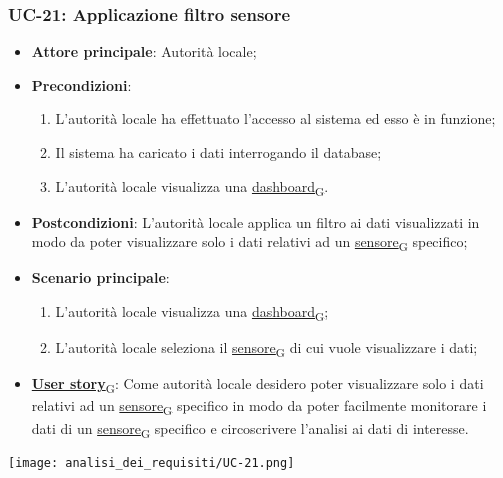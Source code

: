\subsubsection{UC-21: Applicazione filtro sensore}
\begin{itemize}
	\item \textbf{Attore principale}: Autorità locale;
	\item \textbf{Precondizioni}:
	      \begin{enumerate}
		      \item L'autorità locale ha effettuato l'accesso al sistema ed esso è in funzione;
		      \item Il sistema ha caricato i dati interrogando il database;
		      \item L'autorità locale visualizza una \href{https://7last.github.io/docs/rtb/documentazione-interna/glossario\#dashboard}{dashboard\textsubscript{G}}.
	      \end{enumerate}
	\item \textbf{Postcondizioni}: L'autorità locale applica un filtro ai dati visualizzati in modo da poter visualizzare solo i dati relativi ad un \href{https://7last.github.io/docs/rtb/documentazione-interna/glossario\#sensore}{sensore\textsubscript{G}} specifico;
	\item \textbf{Scenario principale}:
	      \begin{enumerate}
		      \item L'autorità locale visualizza una \href{https://7last.github.io/docs/rtb/documentazione-interna/glossario\#dashboard}{dashboard\textsubscript{G}};
		      \item L'autorità locale seleziona il \href{https://7last.github.io/docs/rtb/documentazione-interna/glossario\#sensore}{sensore\textsubscript{G}} di cui vuole visualizzare i dati;
	      \end{enumerate}
	\item \href{https://7last.github.io/docs/rtb/documentazione-interna/glossario\#user-story}{\textbf{User story}\textsubscript{G}}:
	      Come autorità locale desidero poter visualizzare solo i dati relativi ad un \href{https://7last.github.io/docs/rtb/documentazione-interna/glossario\#sensore}{sensore\textsubscript{G}} specifico in modo da poter facilmente
	      monitorare i dati di un \href{https://7last.github.io/docs/rtb/documentazione-interna/glossario\#sensore}{sensore\textsubscript{G}} specifico e circoscrivere l'analisi ai dati di interesse.
\end{itemize}
\begin{center}
	\texttt{[image: analisi\_dei\_requisiti/UC-21.png]}
\end{center}
